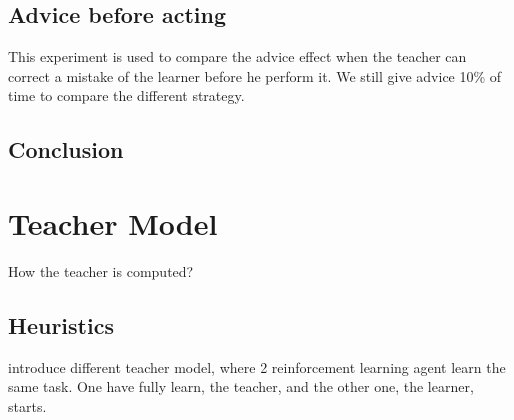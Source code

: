 \documentclass[a4paper,12pt]{article}
\begin{document}
%       
%       
%       
%       
      
      \subsection{Advice before acting}
      
      This experiment is used to compare the advice effect when the teacher can correct a mistake of the 
      learner before he perform it.
      We still give advice 10\% of time to compare the different strategy.
      
      
      \subsection{Conclusion}
      
      \section{Teacher Model}
      
      How the teacher is computed?
      
      \subsection{Heuristics}
      
      \cite{Torrey:2013:TBA:2484920.2485086} introduce different teacher model, where 2 reinforcement learning agent
      learn the same task. One have fully learn, the teacher, and the other one, the learner, starts.
      
\end{document}
